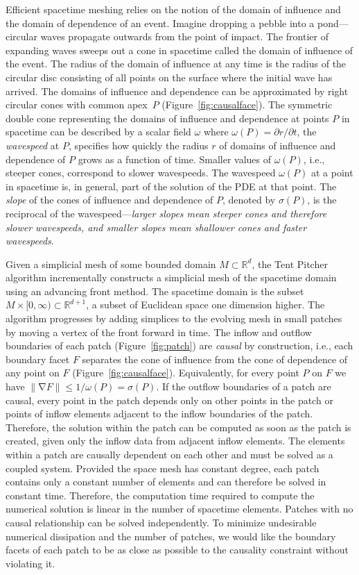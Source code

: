 \documentclass[twocolumn]{article}
\def\Real{\ensuremath{\mathbb{R}}}
\def\S{\ensuremath{\sigma}}
\def\sp{\ensuremath{M}}
\def\fp{\ensuremath{P}}
\DeclareMathOperator{\grad}{\ensuremath{\nabla}}
\def\norm#1{\ensuremath{\mathopen\| #1 \mathclose\|}}
\begin{document}
Efficient spacetime meshing relies on the notion of the domain of
influence and the domain of dependence of an event.  Imagine dropping
a pebble into a pond---circular waves propagate outwards from the
point of impact.  The frontier of expanding waves sweeps out a cone in
spacetime called the domain of influence of the event.  The radius of
the domain of influence at any time is the radius of the circular disc
consisting of all points on the surface where the initial wave has
arrived.  The domains of influence and dependence can be approximated
by right circular cones with common apex~$\fp$
(Figure~\ref{fig:causalface}).  The symmetric double cone representing
the domains of influence and dependence at points $\fp$ in spacetime
can be described by a scalar field $\omega$ where $\omega(\fp) =
\partial r / \partial t$, the \emph{wavespeed} at $\fp$, specifies how
quickly the radius $r$ of domains of influence and dependence of $\fp$
grows as a function of time.  Smaller values of $\omega(\fp)$, i.e.,
steeper cones, correspond to slower wavespeeds.  The wavespeed
$\omega(\fp)$ at a point in spacetime is, in general, part of the
solution of the PDE at that point.  The \emph{slope} of the cones of
influence and dependence of $\fp$, denoted by $\S(\fp)$, is the
reciprocal of the wavespeed---\emph{larger slopes mean steeper cones
  and therefore slower wavespeeds, and smaller slopes mean shallower
  cones and faster wavespeeds}.

Given a simplicial mesh of some bounded domain $\sp \subset \Real^d$,
the Tent Pitcher algorithm incrementally constructs a simplicial mesh
of the spacetime domain using an advancing front method.  The
spacetime domain is the subset $\sp \times [0,\infty) \subset
\Real^{d+1}$, a subset of Euclidean space one dimension higher.  The
algorithm progresses by adding simplices to the evolving mesh in small
patches by moving a vertex of the front forward in time.  The inflow
and outflow boundaries of each patch (Figure~\ref{fig:patch}) are
\emph{causal} by construction, i.e., each boundary facet $F$ separates
the cone of influence from the cone of dependence of any point on $F$
(Figure~\ref{fig:causalface}).  Equivalently, for every point $\fp$ on
$F$ we have $\norm{\grad F} \le 1/\omega(\fp) = \S(\fp)$.  If the
outflow boundaries of a patch are causal, every point in the patch
depends only on other points in the patch or points of inflow elements
adjacent to the inflow boundaries of the patch.  Therefore, the
solution within the patch can be computed as soon as the patch is
created, given only the inflow data from adjacent inflow elements.
The elements within a patch are causally dependent on each other and
must be solved as a coupled system.  Provided the space mesh has
constant degree, each patch contains only a constant number of
elements and can therefore be solved in constant time.  Therefore, the
computation time required to compute the numerical solution is
linear in the number of spacetime elements.  Patches with no causal
relationship can be solved independently.  To minimize undesirable
numerical dissipation and the number of patches, we would like the
boundary facets of each patch to be as close as possible to the
causality constraint without violating it.
\end{document}
